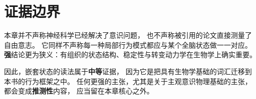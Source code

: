 \section{证据边界}

本章并不声称神经科学已经解决了意识问题，
也不声称被引用的论文直接测量了自由意志。
它同样不声称每一种局部行为模式都应与某个全脑状态做一一对应。
\textbf{强}结论更为狭义：有组织的状态结构、稳定性与转变动力学在生物学上确实重要。

因此，嵌套状态的读法属于\textbf{中等}证据，
因为它是把具有生物学基础的词汇迁移到本书的行为框架之中。
任何更强的主张，尤其是关于主观意识物理基础的主张，都会变成\textbf{推测性}内容，
应当留在本章核心之外。